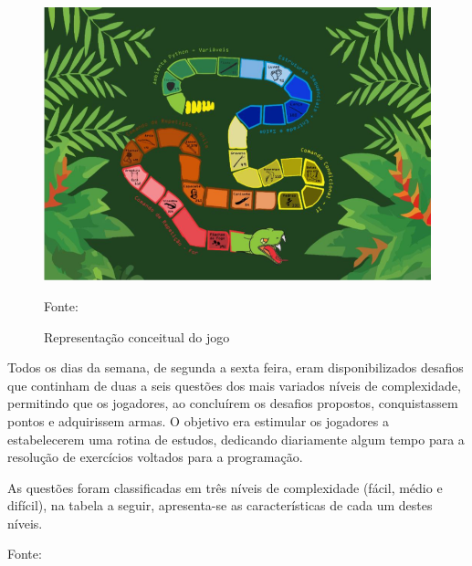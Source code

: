 \begin{figure}[h]
	\centering
	\includegraphics[keepaspectratio=true,scale=0.25]{figuras/desafioSerpente.png}
	\caption{Representação conceitual do jogo}
	Fonte: \cite{raposo2016desafio}
	\label{figura1}
\end{figure}

Todos os dias da semana, de segunda a sexta feira, eram disponibilizados desafios que continham de duas a seis
questões dos mais variados níveis de complexidade, permitindo que os jogadores, ao concluírem os desafios propostos, 
conquistassem pontos e adquirissem armas. O objetivo era estimular os jogadores a estabelecerem uma rotina de estudos,
dedicando diariamente algum tempo para a resolução de exercícios voltados para a programação.

As questões foram classificadas em três níveis de complexidade (fácil, médio e difícil), na tabela a seguir, apresenta-se
as características de cada um destes níveis.

\begin{table}[h]
	\centering
	\caption{Classificação das questões}
	Fonte: \cite{raposo2016desafio}
\end{table}

